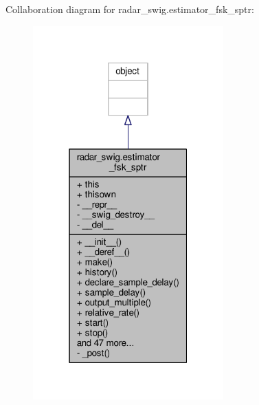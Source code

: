 Collaboration diagram for radar\+\_\+swig.\+estimator\+\_\+fsk\+\_\+sptr\+:
\nopagebreak
\begin{figure}[H]
\begin{center}
\leavevmode
\includegraphics[width=208pt]{d4/d18/classradar__swig_1_1estimator__fsk__sptr__coll__graph}
\end{center}
\end{figure}
